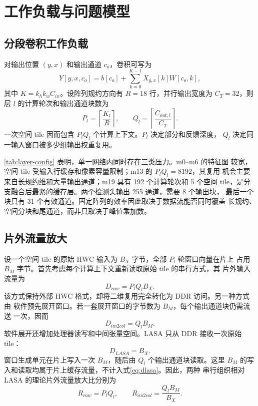 \section{工作负载与问题模型}
\label{sec:problem}

\subsection{分段卷积工作负载}

对输出位置 $(y,x)$ 和输出通道 $c_o$，卷积可写为
\begin{equation}
Y[y,x,c_o]=b[c_o]+\sum_{k=0}^{K-1}X_{y,x}[k]W[c_o,k],
\label{eq:conv}
\end{equation}
其中 $K=k_hk_wC_{in}$。设阵列规约方向有 $R=18$ 行，并行输出宽度为
$C_T=32$，则层 $l$ 的计算轮次和输出通道块数为
\begin{equation}
P_l=\left\lceil\frac{K_l}{R}\right\rceil,\qquad
Q_l=\left\lceil\frac{C_{out,l}}{C_T}\right\rceil .
\label{eq:pq}
\end{equation}
一次空间 tile 因而包含 $P_lQ_l$ 个计算上下文。$P_l$ 决定部分和反馈深度，
$Q_l$ 决定同一输入窗口被多少组输出权重复用。



\cref{tab:layer-config} 表明，单一网络内同时存在三类压力。m0--m6 的特征图
较宽，空间 tile 受输入行缓存和像素容量限制；m13 的 $P_lQ_l=8192$，其复用
机会主要来自长规约维和大量输出通道；m19 具有 192 个计算轮次和 5 个空间
tile，是分支融合后最紧的缓存层。两个检测头输出 255 通道，需要 8 个输出块，
最后一个块只有 31 个有效通道。固定阵列的效率因此取决于数据流能否同时覆盖
长规约、空间分块和尾通道，而非只取决于峰值乘加数。

\subsection{片外流量放大}

设一个空间 tile 的原始 HWC 输入为 $B_X$ 字节，全部 $P_l$ 轮窗口向量在片上
占用 $B_M$ 字节。首先考虑每个计算上下文重新读取原始 tile 的串行方式，其
片外输入流量为
\begin{equation}
D_{raw}=P_lQ_lB_X .
\label{eq:draw}
\end{equation}
该方式保持外部 HWC 格式，却将二维复用完全转化为 DDR 访问。另一种方式由
软件预先展开窗口。若一套展开窗口的字节数为 $B_M$，每个输出通道块仍需流送
一次，因而
\begin{equation}
D_{im2col}=Q_lB_M .
\label{eq:dim2col}
\end{equation}
软件展开还增加处理器读写和中间张量空间。LASA 只从 DDR 接收一次原始 tile：
\begin{equation}
D_{LASA}=B_X .
\label{eq:dlasa}
\end{equation}
窗口生成单元在片上写入一次 $B_M$，随后由 $Q_l$ 个输出通道块读取。这里
$B_M$ 的写入和读取均属于片上缓存流量，不计入式\eqref{eq:dlasa}。因此，两种
串行组织相对 LASA 的理论片外流量放大比分别为
\begin{equation}
R_{raw}=P_lQ_l,\qquad
R_{im2col}=\frac{Q_lB_M}{B_X}.
\label{eq:traffic-ratio}
\end{equation}

